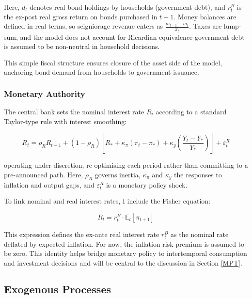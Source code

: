 \documentclass[11pt,preprint]{elsarticle}
\numberwithin{equation}{section}
\numberwithin{figure}{section}
\numberwithin{table}{section}
\begin{document}
Here, \(d_t\) denotes real bond holdings by households (government
debt), and \(r^B_t\) is the ex-post real gross return on bonds purchased
in \(t-1\). Money balances are defined in real terms, so seigniorage
revenue enters as \(\frac{m_{t-1} - m_t}{\pi_t}\). Taxes are lump-sum,
and the model does not account for Ricardian equivalence-government debt
is assumed to be non-neutral in household decisions.

This simple fiscal structure ensures closure of the asset side of the
model, anchoring bond demand from households to government issuance.

\subsubsection{Monetary Authority}\label{monetary-authority}

The central bank sets the nominal interest rate \(R_t\) according to a
standard Taylor-type rule with interest smoothing:

\begin{equation}
R_t = \rho_R R_{t-1} + (1 - \rho_R) \left[ R_* + \kappa_\pi (\pi_t - \pi_*) + \kappa_y \left( \frac{Y_t - Y_*}{Y_*} \right) \right] + \varepsilon_t^R
\label{taylor_rule}
\end{equation}

operating under discretion, re-optimising each period rather than
committing to a pre-announced path. Here, \(\rho_R\) governs inertia,
\(\kappa_\pi\) and \(\kappa_y\) the responses to inflation and output
gaps, and \(\varepsilon_t^R\) is a monetary policy shock.

To link nominal and real interest rates, I include the Fisher equation:

\begin{equation}
R_t = r^B_t \cdot \mathbb{E}_t[\pi_{t+1}]
\label{fisher}
\end{equation}

This expression defines the ex-ante real interest rate \(r^B_t\) as the
nominal rate deflated by expected inflation. For now, the inflation risk
premium is assumed to be zero. This identity helps bridge monetary
policy to intertemporal consumption and investment decisions and will be
central to the discussion in Section \ref{MPT}.

\subsection{Exogenous Processes}\label{exogenous-processes}
\end{document}
